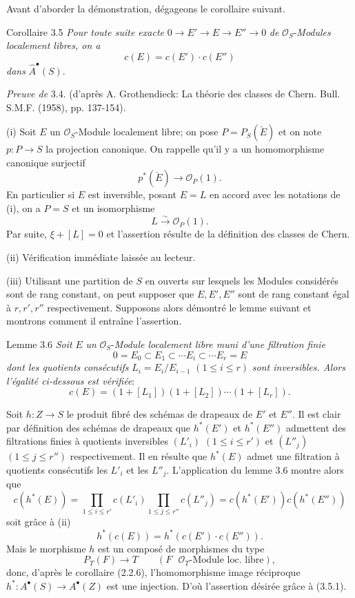 Avant d'aborder la démonstration, dégageons le corollaire suivant.

\begin{statement}{Corollaire 3.5}
\emph{Pour toute suite exacte} $0\to E'\to E\to E''\to0$ \emph{de} $\mathcal{O}_S$-\emph{Modules localement libres, on a}
\[
c(E)=c(E')\cdot c(E'')
\]
\emph{dans} $\widehat A^{\bullet}(S)$.
\end{statement}

\emph{Preuve de} 3.4. (d'après A. Grothendieck: La théorie des classes de Chern. Bull. S.M.F. (1958), pp. 137-154).

(i)
Soit $E$ un $\mathcal{O}_S$-Module localement libre; on pose $P=P_S(\check E)$ et on note $p:P\to S$ la projection canonique. On rappelle qu'il y a un homomorphisme canonique surjectif
\[
p^*(\check E)\longrightarrow \mathcal{O}_P(1).
\]
En particulier si $E$ est inversible, posant $E=L$ en accord avec les notations de (i), on a $P=S$ et un isomorphisme
\[
L\xrightarrow{\sim}\mathcal{O}_P(1).
\]
Par suite, $\xi+[L]=0$ et l'assertion résulte de la définition des classes de Chern.

(ii) Vérification immédiate laissée au lecteur.

(iii) Utilisant une partition de $S$ en ouverts sur lesquels les Modules considérés sont de rang constant, on peut supposer que $E,E',E''$ sont de rang constant égal à $r,r',r''$ respectivement. Supposons alors démontré le lemme suivant et montrons comment il entraîne l'assertion.

\begin{statement}{Lemme 3.6}
\emph{Soit} $E$ \emph{un} $\mathcal{O}_S$-\emph{Module localement libre muni d'une filtration finie}
\[
0=E_0\subset E_1\subset\cdots E_i\subset\cdots E_r=E
\]
\emph{dont les quotients consécutifs} $L_i=E_i/E_{i-1}$ $(1\le i\le r)$ \emph{sont inversibles. Alors l'égalité ci-dessous est vérifiée}:
\[
c(E)=(1+[L_1])(1+[L_2])\cdots(1+[L_r]).
\]
\end{statement}

Soit $h:Z\to S$ le produit fibré des schémas de drapeaux de $E'$ et $E''$. Il est clair par définition des schémas de drapeaux que $h^*(E')$ et $h^*(E'')$ admettent des filtrations finies à quotients inversibles $(L'_i)$ $(1\le i\le r')$ et $(L''_j)$ $(1\le j\le r'')$ respectivement. Il en résulte que $h^*(E)$ admet une filtration à quotients consécutifs les $L'_i$ et les $L''_j$. L'application du lemme 3.6 montre alors que
\[
c(h^*(E))=
\prod_{1\le i\le r'}c(L'_i)\prod_{1\le j\le r''}c(L''_j)
=c(h^*(E'))c(h^*(E''))
\]
soit grâce à (ii)
\[
h^*(c(E))=h^*(c(E')\cdot c(E'')).
\tag{3.5.1.}
\]
Mais le morphisme $h$ est un composé de morphismes du type
\[
P_T(F)\longrightarrow T
\qquad (F\text{ }\mathcal{O}_T\text{-Module loc. libre}),
\]
donc, d'après le corollaire (2.2.6), l'homomorphisme image réciproque $h^*:A^{\bullet}(S)\to A^{\bullet}(Z)$ est une injection. D'où l'assertion désirée grâce à (3.5.1).

